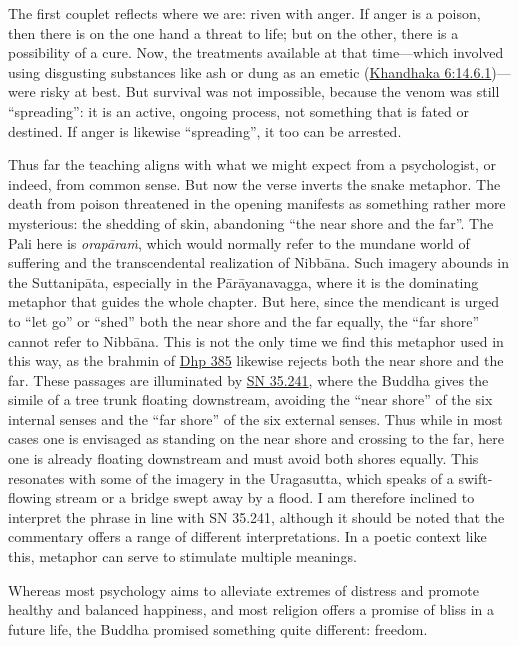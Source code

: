 \documentclass[12pt,openany]{book}%
\begin{document}
The first couplet reflects where we are: riven with anger. If anger is a poison, then there is on the one hand a threat to life; but on the other, there is a possibility of a cure. Now, the treatments available at that time—which involved using disgusting substances like ash or dung as an emetic (\href{https://suttacentral.net/pli-tv-kd6/en/brahmali\#14.6.1}{Khandhaka 6:14.6.1})—were risky at best. But survival was not impossible, because the venom was still “spreading”: it is an active, ongoing process, not something that is fated or destined. If anger is likewise “spreading”, it too can be arrested.

Thus far the teaching aligns with what we might expect from a psychologist, or indeed, from common sense. But now the verse inverts the snake metaphor. The death from poison threatened in the opening manifests as something rather more mysterious: the shedding of skin, abandoning “the near shore and the far”. The Pali here is \textit{\textsanskrit{orapāraṁ}}, which would normally refer to the mundane world of suffering and the transcendental realization of \textsanskrit{Nibbāna}. Such imagery abounds in the \textsanskrit{Suttanipāta}, especially in the \textsanskrit{Pārāyanavagga}, where it is the dominating metaphor that guides the whole chapter. But here, since the mendicant is urged to “let go” or “shed” both the near shore and the far equally, the “far shore” cannot refer to \textsanskrit{Nibbāna}. This is not the only time we find this metaphor used in this way, as the brahmin of \href{https://suttacentral.net/dhp385}{Dhp 385} likewise rejects both the near shore and the far. These passages are illuminated by \href{https://suttacentral.net/sn35.241}{SN 35.241}, where the Buddha gives the simile of a tree trunk floating downstream, avoiding the “near shore” of the six internal senses and the “far shore” of the six external senses. Thus while in most cases one is envisaged as standing on the near shore and crossing to the far, here one is already floating downstream and must avoid both shores equally. This resonates with some of the imagery in the Uragasutta, which speaks of a swift-flowing stream or a bridge swept away by a flood. I am therefore inclined to interpret the phrase in line with SN 35.241, although it should be noted that the commentary offers a range of different interpretations. In a poetic context like this, metaphor can serve to stimulate multiple meanings. 

Whereas most psychology aims to alleviate extremes of distress and promote healthy and balanced happiness, and most religion offers a promise of bliss in a future life, the Buddha promised something quite different: freedom.
\end{document}
